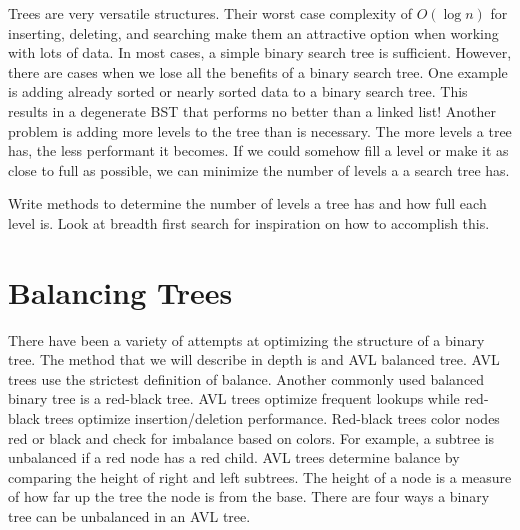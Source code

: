 \label{lab:btrees}

Trees are very versatile structures.  
Their worst case complexity of $O(\log n)$ for inserting, deleting, and searching make them an attractive option when working with lots of data.
In most cases, a simple binary search tree is sufficient.
However, there are cases when we lose all the benefits of a binary search tree.
One example is adding already sorted or nearly sorted data to a binary search tree.
This results in a degenerate BST that performs no better than a linked list!
Another problem is adding more levels to the tree than is necessary.
The more levels a tree has, the less performant it becomes.  If we could somehow fill a level or make it as close to full as possible, we can minimize the number of levels a a search tree has.

\begin{problem}
Write methods to determine the number of levels a tree has and how full each level is.  Look at breadth first search for inspiration on how to accomplish this.
\end{problem}

\section*{Balancing Trees}
There have been a variety of attempts at optimizing the structure of a binary tree.
The method that we will describe in depth is and AVL balanced tree.
AVL trees use the strictest definition of balance.
Another commonly used balanced binary tree is a red-black tree.  AVL trees optimize frequent lookups while red-black trees optimize insertion/deletion performance.
Red-black trees color nodes red or black and check for imbalance based on colors.  For example, a subtree is unbalanced if a red node has a red child.
AVL trees determine balance by comparing the height of right and  left subtrees.
The height of a node is a measure of how far up the tree the node is from the base.
There are four ways a binary tree can be unbalanced in an AVL tree.

